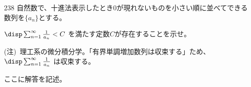\begin{thm}{238}{}{}
 自然数で、十進法表示したとき0が現れないものを小さい順に並べてできる数列を$\{a_n\}$とする。

 $\disp \sum_{n=1}^\infty \frac{1}{a_n} < C$ を満たす定数$C$が存在することを示せ。

 {\tiny (注)~理工系の微分積分学。「有界単調増加数列は収束する」ため、$\disp \sum_{n=1}^\infty \frac{1}{a_n}$ は収束する。}
\end{thm}

ここに解答を記述。